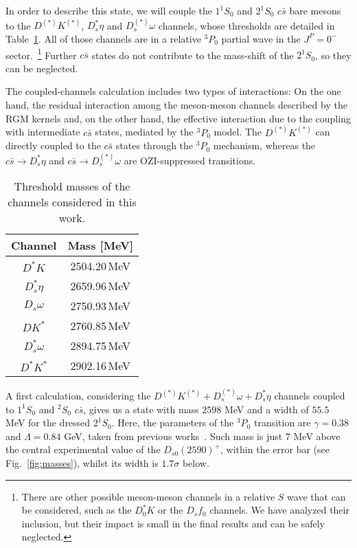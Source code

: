 \documentclass[aps, prd, floatfix, twocolumn, superscriptaddress, nofootinbib]{revtex4-1}
\begin{document}
In order to describe this state, we will couple the $1^1S_0$ and $2^1S_0$ $c\bar s$ bare mesons to the $D^{(*)}K^{(*)}$, $D_s^*\eta$ and $D_s^{(*)}\omega$ channels, whose thresholds are detailed in Table~\ref{tab:thres}. All of those channels are in a relative $^3P_0$ partial wave in the $J^P=0^-$ sector.~\footnote{There are other possible meson-meson channels in a relative $S$ wave that can be considered, such as the $D_0^* K$ or the $D_s f_0$ channels. We have analyzed their inclusion, but their impact is small in the final results and can be safely neglected.} Further $c\bar s$ states do not contribute to the mass-shift of the $2^1S_0$, so they can be neglected.

The coupled-channels calculation includes two types of interactions: On the one hand, the residual interaction among the meson-meson channels described by the RGM kernels and, on the other hand, the effective interaction due to the coupling with intermediate $c\bar s$ states, mediated by the $^3P_0$ model. The $D^{(*)}K^{(*)}$ can directly coupled to the $c\bar s$ states through the $^3P_0$ mechanism, whereas the 
$c\bar s\to D_s^*\eta$ and $c\bar s\to D_s^{(*)}\omega$ are OZI-suppressed transitions.

\begin{table}[!t]
\begin{tabular}{cc}
\hline\hline
 Channel  & Mass [MeV]  \\ \hline
 $D^*K$ & 2504.20\,MeV \\
 $D_s^*\eta$ & 2659.96\,MeV\\
 $D_s\omega$ & 2750.93\,MeV\\
 $DK^*$ & 2760.85\,MeV\\
 $D_s^*\omega$ & 2894.75\,MeV \\
 $D^*K^*$ & 2902.16\,MeV \\
  \hline\hline
\end{tabular}
\caption{\label{tab:thres} Threshold masses of the channels considered in this work. }
\end{table}

A first calculation, considering the $D^{(*)}K^{(*)}+D_s^{(*)}\omega+D_s^*\eta$ channels coupled to $1^1S_0$ and $^2S_0$ $c\bar s$, gives us a state with mass $2598$ MeV and a width of $55.5$ MeV for the dressed $2^1S_0$. Here, the parameters of the $^3P_0$ transition are $\gamma=0.38$ and $\Lambda=0.84$ GeV, taken from previous works~\cite{Ortega:2016mms}.  Such mass is just $7$ MeV above the central experimental value of the $D_{s0}(2590)^+$, within the error bar (see Fig.~\ref{fig:masses}), whilst its width is $1.7\sigma$ below.
\end{document}
